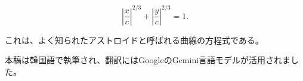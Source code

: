 \documentclass[twocolumn]{article}
\begin{document}
	$$ \left|\dfrac{x}{c}\right|^{2/3} + \left|\dfrac{y}{c}\right|^{2/3} = 1. $$
	
	これは、よく知られたアストロイドと呼ばれる曲線の方程式である。
	
	\vfill
	

	\noindent
	本稿は韓国語で執筆され、翻訳にはGoogleのGemini言語モデルが活用されました。
%	
%	
	
\end{document}
